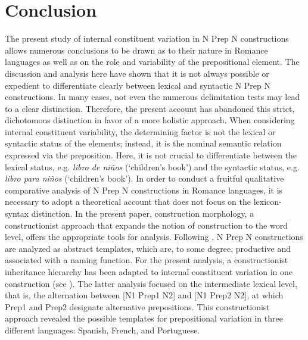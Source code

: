 \documentclass[output=paper]{langsci/langscibook}
\begin{document}
\section{Conclusion}

The present study of internal constituent variation in N Prep N constructions allows numerous conclusions to be drawn as to their nature in Romance languages as well as on the role and variability of the prepositional element. The discussion and analysis here have shown that it is not always possible or expedient to differentiate clearly between lexical and syntactic N Prep N constructions. In many cases, not even the numerous delimitation tests may lead to a clear distinction. Therefore, the present account has abandoned this strict, dichotomous distinction in favor of a more holistic approach. When considering internal constituent variability, the determining factor is not the lexical or syntactic status of the elements; instead, it is the nominal semantic relation expressed via the preposition. Here, it is not crucial to differentiate between the lexical status, e.g. \textit{libro de niños} (`children’s book') and the syntactic status, e.g. \textit{libro para niños} (`children’s book'). In order to conduct a fruitful qualitative comparative analysis of N Prep N constructions in Romance languages, it is necessary to adopt a theoretical account that does not focus on the lexicon-syntax distinction. In the present paper, construction morphology, a constructionist approach that expands the notion of construction to the word level, offers the appropriate tools for analysis. Following \citet[261]{Masini:2009}, N Prep N constructions are analyzed as abstract templates, which are, to some degree, productive and associated with a naming function. For the present analysis, a constructionist inheritance hierarchy has been adapted to internal constituent variation in one construction (see ). The latter analysis focused on the intermediate lexical level, that is, the alternation between [N1 Prep1 N2] and [N1 Prep2 N2], at which Prep1 and Prep2 designate alternative prepositions. This constructionist approach revealed the possible templates for prepositional variation in three different languages: Spanish, French, and Portuguese. 
\end{document}
